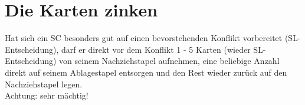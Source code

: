 \section{Die Karten zinken}
Hat sich ein SC besonders gut auf einen bevorstehenden Konflikt vorbereitet (SL-Entscheidung), darf er direkt vor dem Konflikt 1 - 5 Karten (wieder SL-Entscheidung) von seinem Nachziehstapel aufnehmen, eine beliebige Anzahl direkt auf seinem Ablagestapel entsorgen und den Rest wieder zurück auf den Nachziehstapel legen.
\\
Achtung: sehr mächtig!

